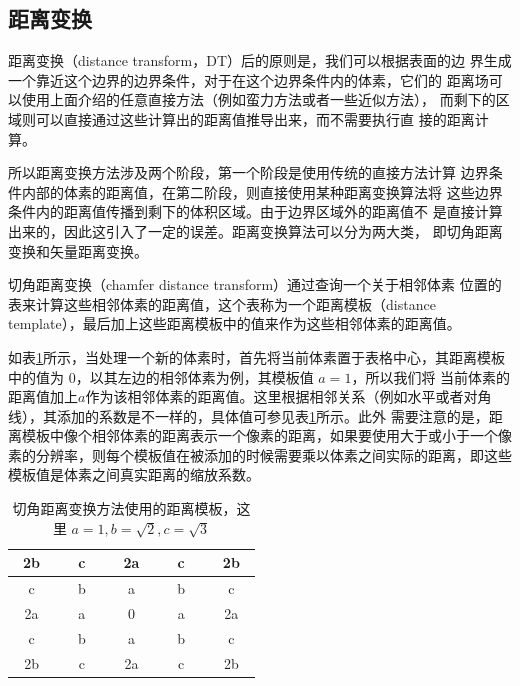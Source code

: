 \subsection{距离变换}
距离变换（distance transform，DT）后的原则是，我们可以根据表面的边 界生成一个靠近这个边界的边界条件，对于在这个边界条件内的体素，它们的 距离场可以使用上面介绍的任意直接方法（例如蛮力方法或者一些近似方法）， 而剩下的区域则可以直接通过这些计算出的距离值推导出来，而不需要执行直 接的距离计算。

所以距离变换方法涉及两个阶段，第一个阶段是使用传统的直接方法计算 边界条件内部的体素的距离值，在第二阶段，则直接使用某种距离变换算法将 这些边界条件内的距离值传播到剩下的体积区域。由于边界区域外的距离值不 是直接计算出来的，因此这引入了一定的误差。距离变换算法可以分为两大类， 即切角距离变换和矢量距离变换。

切角距离变换（chamfer distance transform）通过查询一个关于相邻体素 位置的表来计算这些相邻体素的距离值，这个表称为一个距离模板（distance template），最后加上这些距离模板中的值来作为这些相邻体素的距离值。

如表\ref{t:distance-template}所示，当处理一个新的体素时，首先将当前体素置于表格中心，其距离模板中的值为 0，以其左边的相邻体素为例，其模板值 $a = 1$，所以我们将 当前体素的距离值加上$a$作为该相邻体素的距离值。这里根据相邻关系（例如水平或者对角线），其添加的系数是不一样的，具体值可参见表\ref{t:distance-template}所示。此外 需要注意的是，距离模板中像个相邻体素的距离表示一个像素的距离，如果要使用大于或小于一个像素的分辨率，则每个模板值在被添加的时候需要乘以体素之间实际的距离，即这些模板值是体素之间真实距离的缩放系数。

\begin{table}
\begin{center}
	\begin{tabular}{|c|c|c|c|c|}
		\hline
		~2b~ & ~~c~~ & ~2a~ & ~~c~~ & ~2b~\\
		\hline
		c&b&a&b&c\\
		\hline
		2a&a&0&a&2a\\
		\hline
		c&b&a&b&c\\
		\hline
		2b&c&2a&c&2b\\
		\hline
	\end{tabular}
\end{center}
\caption{切角距离变换方法使用的距离模板，这里 $a=1,b=\sqrt{2},c=\sqrt{3}$}
\label{t:distance-template}
\end{table}

